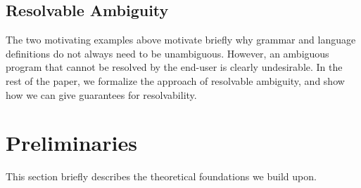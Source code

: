 \documentclass[runningheads]{llncs}
\begin{document}



\subsection{Resolvable Ambiguity}
The two motivating examples above motivate briefly why grammar
and language definitions do not always need to be unambiguous. However, an
ambiguous program that cannot be resolved by the end-user is clearly
undesirable. In the rest of the paper, we formalize the approach of
resolvable ambiguity, and show how we can give guarantees for
resolvability.




\section{Preliminaries}
\label{sec:prel}

This section briefly describes the theoretical foundations we build upon.

\end{document}

